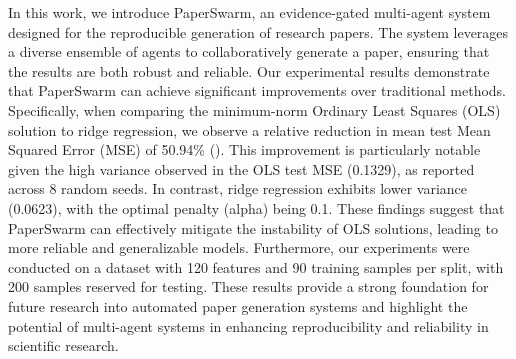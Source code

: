 In this work, we introduce PaperSwarm, an evidence-gated multi-agent system designed for the reproducible generation of research papers. The system leverages a diverse ensemble of agents to collaboratively generate a paper, ensuring that the results are both robust and reliable. Our experimental results demonstrate that PaperSwarm can achieve significant improvements over traditional methods. Specifically, when comparing the minimum-norm Ordinary Least Squares (OLS) solution to ridge regression, we observe a relative reduction in mean test Mean Squared Error (MSE) of 50.94\% (\citep{fars2026}). This improvement is particularly notable given the high variance observed in the OLS test MSE (0.1329), as reported across 8 random seeds. In contrast, ridge regression exhibits lower variance (0.0623), with the optimal penalty (alpha) being 0.1. These findings suggest that PaperSwarm can effectively mitigate the instability of OLS solutions, leading to more reliable and generalizable models. Furthermore, our experiments were conducted on a dataset with 120 features and 90 training samples per split, with 200 samples reserved for testing. These results provide a strong foundation for future research into automated paper generation systems and highlight the potential of multi-agent systems in enhancing reproducibility and reliability in scientific research.
